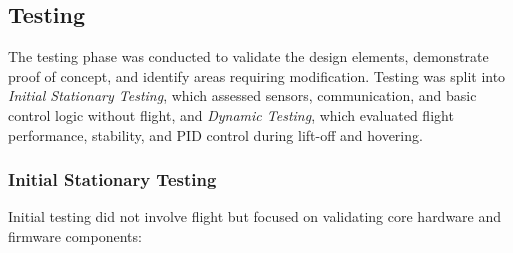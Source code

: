 \subsection{Testing}





The testing phase was conducted to validate the design elements, demonstrate proof of concept, and identify areas requiring modification. Testing was split into \textit{Initial Stationary Testing}, which assessed sensors, communication, and basic control logic without flight, and \textit{Dynamic Testing}, which evaluated flight performance, stability, and PID control during lift-off and hovering.

\subsubsection{Initial Stationary Testing} \leavevmode

Initial testing did not involve flight but focused on validating core hardware and firmware components:

